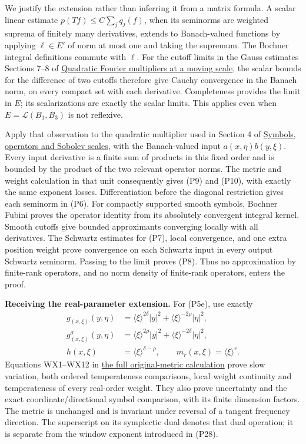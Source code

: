 \documentclass[
  11pt,
]{article}
\begin{document}
We justify the extension rather than inferring it from a matrix formula.
A scalar linear estimate \(p(Tf)\leq C\sum_jq_j(f)\), when its seminorms
are weighted suprema of finitely many derivatives, extends to
Banach-valued functions by applying \(\ell\in E'\) of norm at most one
and taking the supremum. The Bochner integral definitions commute with
\(\ell\). For the cutoff limits in the Gauss estimates Sections 7--8 of
\href{gauss-transform-estimates.pdf}{Quadratic Fourier multipliers at a
moving scale}, the scalar bounds for the difference of two cutoffs
therefore give Cauchy convergence in the Banach norm, on every compact
set with each derivative. Completeness provides the limit in \(E\); its
scalarizations are exactly the scalar limits. This applies even when
\(E=\mathcal L(B_1,B_3)\) is not reflexive.

Apply that observation to the quadratic multiplier used in Section 4 of
\href{euclidean-symbol-calculus.pdf}{Symbols, operators and Sobolev
scales}, with the Banach-valued input \(a(x,\eta)b(y,\xi)\). Every input
derivative is a finite sum of products in this fixed order and is
bounded by the product of the two relevant operator norms. The metric
and weight calculation in that unit consequently gives (P9) and (P10),
with exactly the same exponent losses. Differentiation before the
diagonal restriction gives each seminorm in (P6). For compactly
supported smooth symbols, Bochner Fubini proves the operator identity
from its absolutely convergent integral kernel. Smooth cutoffs give
bounded approximants converging locally with all derivatives. The
Schwartz estimates for (P7), local convergence, and one extra position
weight prove convergence on each Schwartz input in every output Schwartz
seminorm. Passing to the limit proves (P8). Thus no approximation by
finite-rank operators, and no norm density of finite-rank operators,
enters the proof.

\textbf{Receiving the real-parameter extension.} For (P5e), use exactly
\[
 \begin{split}
 g_{(x,\xi)}(y,\eta)&=\langle\xi\rangle^{2\delta}|y|^2
                 +\langle\xi\rangle^{-2\rho}|\eta|^2,\\
 g_{(x,\xi)}^\sigma(y,\eta)&=\langle\xi\rangle^{2\rho}|y|^2
                 +\langle\xi\rangle^{-2\delta}|\eta|^2,\\
 h(x,\xi)&=\langle\xi\rangle^{\delta-\rho},\qquad
 m_r(x,\xi)=\langle\xi\rangle^r.
 \end{split}
 \tag{P8e}
\] Equations WX1--WX12 in
\href{weyl-metric-products.pdf\#section*.99}{the
full original-metric calculation} prove slow variation, both ordered
temperateness comparisons, local weight continuity and temperateness of
every real-order weight. They also prove uncertainty and the exact
coordinate/directional symbol comparison, with its finite dimension
factors. The metric is unchanged and is invariant under reversal of a
tangent frequency direction. The superscript on its symplectic dual
denotes that dual operation; it is separate from the window exponent
introduced in (P28).
\end{document}
